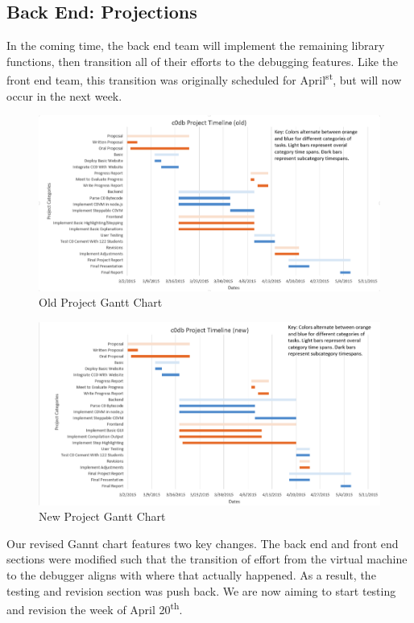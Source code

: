 \documentclass[11pt]{article}
\begin{document}
\subsection*{Back End: Projections}
In the coming time, the back end team will implement the remaining library
functions, then transition all of their efforts to the debugging features. Like
the front end team, this transition was originally scheduled for
April\textsuperscript{st}, but will now occur in the next week.
\begin{figure}[h]
  \centering
  \includegraphics[width=\linewidth]{old-gantt.png}
  \caption{Old Project Gantt Chart}
  \label{fig:old-gantt}
\end{figure}
\begin{figure}[h]
  \centering
  \includegraphics[width=\linewidth]{new-gantt.png}
  \caption{New Project Gantt Chart}
  \label{fig:new-gantt}
\end{figure}
Our revised Gannt chart features two key changes. The back end and front end
sections were modified such that the transition of effort from the virtual
machine to the debugger aligns with where that actually happened. As a result,
the testing and revision section was push back. We are now aiming to start
testing and revision the week of April 20\textsuperscript{th}.
\end{document}

